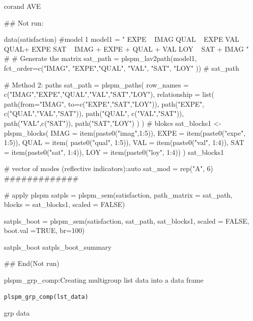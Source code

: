 \documentclass[a4paper]{book}
\begin{document}
%
\begin{Value}
corand AVE
\end{Value}
%
\begin{Examples}
\begin{ExampleCode}

\#\# Not run: 

data(satisfaction)
#model 1
model1 = "
EXPE ~ IMAG
QUAL ~ EXPE
VAL ~  QUAL+ EXPE
SAT ~ IMAG + EXPE + QUAL + VAL
LOY ~ SAT + IMAG
"
# # Generate the matrix
sat_path = plspm_lav2path(model1,
                          fct_order=c("IMAG", "EXPE","QUAL", "VAL", "SAT", "LOY" ))
# sat_path

# Method 2: paths
sat_path = plspm_paths(
  row_names = c("IMAG","EXPE","QUAL","VAL","SAT","LOY"),
  relationship = list(
    path(from="IMAG", to=c("EXPE","SAT","LOY")),
    path("EXPE", c("QUAL","VAL","SAT")),
    path("QUAL", c("VAL","SAT")),
    path("VAL",c("SAT")),
    path("SAT","LOY")
  )
)
# blokcs
sat_blocks1 <- plspm_blocks(
  IMAG = item(paste0("imag",1:5)),
  EXPE = item(paste0("expe", 1:5)),
  QUAL = item( paste0("qual", 1:5)),
  VAL = item(paste0("val", 1:4)),
  SAT = item(paste0("sat", 1:4)),
  LOY = item(paste0("loy", 1:4))
)
sat_blocks1

# vector of modes (reflective indicators):auto
sat_mod = rep("A", 6)
#############

# apply plspm
satpls = plspm_sem(satisfaction,
                   path_matrix = sat_path,
                   blocks = sat_blocks1,
                   scaled = FALSE)

satpls_boot = plspm_sem(satisfaction, sat_path, sat_blocks1, scaled = FALSE,
                        boot.val =TRUE, br=100)

satpls_boot %
satpls_boot_summary %


## End(Not run)
\end{ExampleCode}
\end{Examples}
%
\begin{Description}
plspm\_grp\_comp:Creating multigroup list data into a data frame
\end{Description}
%
\begin{Usage}
\begin{verbatim}
plspm_grp_comp(lst_data)
\end{verbatim}
\end{Usage}
%
\begin{Arguments}
\begin{ldescription}
\item[\code{lst\_data}] grp data
\end{ldescription}
\end{Arguments}
\end{document}
